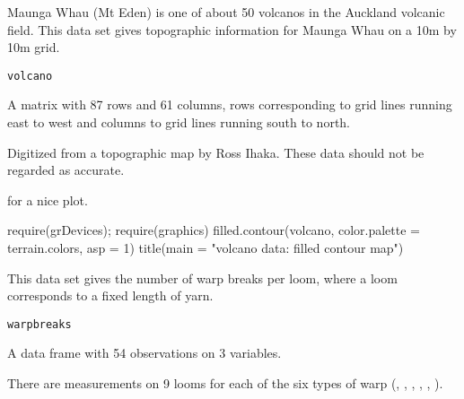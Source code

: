 %
\begin{Description}\relax
Maunga Whau (Mt Eden) is one of about 50 volcanos in the Auckland
volcanic field.  This data set gives topographic information for
Maunga Whau on a 10m by 10m grid.
\end{Description}
%
\begin{Usage}
\begin{verbatim}
volcano
\end{verbatim}
\end{Usage}
%
\begin{Format}
A matrix with 87 rows and 61 columns, rows corresponding to grid lines
running east to west and columns to grid lines running south to
north.
\end{Format}
%
\begin{Source}\relax
Digitized from a topographic map by Ross Ihaka.
These data should not be regarded as accurate.
\end{Source}
%
\begin{SeeAlso}\relax
{} for a nice plot.
\end{SeeAlso}
%
\begin{Examples}
\begin{ExampleCode}
require(grDevices); require(graphics)
filled.contour(volcano, color.palette = terrain.colors, asp = 1)
title(main = "volcano data: filled contour map")
\end{ExampleCode}
\end{Examples}
%
\begin{Description}\relax
This data set gives the number of warp breaks per loom, where a loom
corresponds to a fixed length of yarn.
\end{Description}
%
\begin{Usage}
\begin{verbatim}
warpbreaks
\end{verbatim}
\end{Usage}
%
\begin{Format}
A data frame with 54 observations on 3 variables.

There are measurements on 9 looms for each of the six types of warp
(, , , , , ).
\end{Format}
